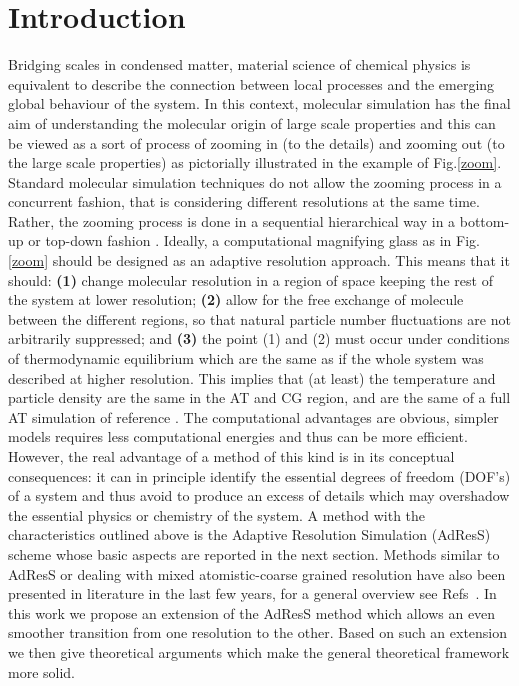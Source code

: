 \documentclass[aps,pre,preprint]{revtex4}
\newcommand{\recheck}[1]{{\color{red} #1}}
\begin{document}
\section{Introduction}
Bridging scales in condensed matter, material science of chemical physics is equivalent to describe the connection between local processes and the emerging global behaviour of the system. In this context, molecular simulation has the final aim of understanding the molecular origin of large scale properties and this can be viewed as a sort of process of zooming in (to the details) and zooming out (to the large scale properties) as pictorially illustrated in the example of Fig.\ref{zoom}. Standard molecular simulation techniques do not allow the zooming process in a concurrent fashion, that is considering different resolutions at the same time. Rather, the zooming process is done in a sequential hierarchical way in a bottom-up or top-down fashion \cite{annurev}. Ideally, a computational magnifying glass as in Fig.\ref{zoom} should be designed as an adaptive resolution approach. This means that it should: {\bf (1)} change molecular resolution in a region of space keeping the rest of the system at lower resolution; {\bf (2)} allow for the free exchange of molecule between the different regions, so that natural particle number fluctuations  are not arbitrarily suppressed; and {\bf (3)} the point (1) and (2) must occur under conditions of thermodynamic equilibrium which are the same as if the whole system was described at higher resolution.
This implies that (at least) the temperature and particle density are the same in the AT and CG region, and are the same of a full AT simulation of reference \cite{annurev}. The computational advantages are obvious, simpler models requires less computational energies and thus can be more efficient. However, the real advantage of a method of this kind is in its conceptual consequences: it can in principle identify the essential degrees of freedom (DOF's) of a system and thus avoid to produce an excess of details which may overshadow the essential physics or chemistry of the system. A method with the characteristics outlined above is the Adaptive Resolution Simulation (AdResS) scheme \cite{jcp,pre} whose basic aspects are reported in the next section. \recheck{Methods similar to AdResS or dealing with mixed atomistic-coarse grained resolution have also been presented in literature in the last few years, for a general overview see Refs~\cite{klein,heyden,voth1,voth2,ensingprl,prlcomm}}. In this work we propose an extension of the AdResS method which allows an even smoother transition from one resolution to the other. Based on such an extension we then give theoretical arguments which make the general theoretical framework more solid.
\end{document}
